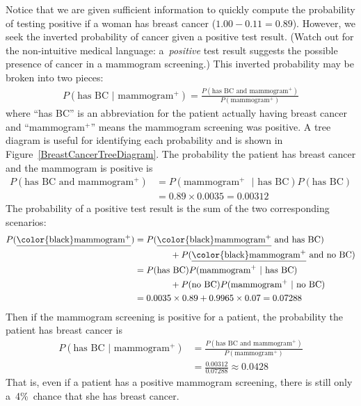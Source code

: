 \begin{examplewrap}
\begin{nexample}
Notice that we are given sufficient information to quickly compute the probability of testing positive if a woman has breast cancer ($1.00-0.11=0.89$). However, we seek the inverted probability of cancer given a positive test result. (Watch out for the non-intuitive medical language: a~\emph{positive} test result suggests the possible presence of cancer in a mammogram screening.) This inverted probability may be broken into two pieces:
\begin{align*}
P(\text{has BC } | \text{ mammogram$^+$}) = \frac{P(\text{has BC and mammogram$^+$})}{P(\text{mammogram$^+$})}
\end{align*}
where ``has BC'' is an abbreviation for the patient actually having breast cancer and ``mammogram$^+$'' means the mammogram screening was positive. A tree diagram is useful for identifying each probability and is shown in Figure~\ref{BreastCancerTreeDiagram}. The probability the patient has breast cancer and the mammogram is positive is
\begin{align*}
P(\text{has BC and mammogram$^+$}) &= P(\text{mammogram$^+$ } | \text{ has BC})P(\text{has BC}) \\
	&= 0.89\times 0.0035 = 0.00312
\end{align*}
The probability of a positive test result is the sum of the two corresponding scenarios:
\begin{align*}
P(\text{\underline{\color{black}mammogram$^+$}})
  &= P(\text{\underline{\color{black}mammogram$^+$} and has BC}) \\
  &\qquad\qquad
      + P(\text{\underline{\color{black}mammogram$^+$} and no BC})\\
  &= P(\text{has BC})P(\text{mammogram$^+$ } | \text{ has BC}) \\
  &\qquad\qquad
      + P(\text{no BC})P(\text{mammogram$^+$ } | \text{ no BC}) \\
  &= 0.0035\times 0.89 + 0.9965\times 0.07 = 0.07288
\end{align*}
Then if the mammogram screening is positive for a patient, the probability the patient has breast cancer is
\begin{align*}
P(\text{has BC } | \text{ mammogram$^+$})
	&= \frac{P(\text{has BC and mammogram$^+$})}{P(\text{mammogram$^+$})}\\
	&= \frac{0.00312}{0.07288} \approx 0.0428
\end{align*}
That is, even if a patient has a positive mammogram screening, there is still only a~4\%~chance that she has breast cancer.
\end{nexample}
\end{examplewrap}

